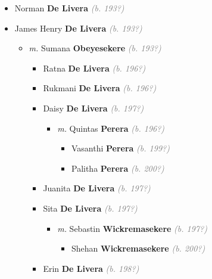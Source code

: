 \documentclass[10pt, openany]{book}
\begin{document}
\begin{itemize}
{\begin{itemize}
\item{Norman \textbf{De Livera} \textcolor{gray}{\textit{(b. 193?)}}
  }
\item{James Henry  \textbf{De Livera} \textcolor{gray}{\textit{(b. 193?)}}
\begin{itemize}
\item{\textit{m.} Sumana \textbf{Obeyesekere} \textcolor{gray}{\textit{(b. 193?)}}   \label{couple:00001229:00002347} \begin{itemize}
\item{Ratna \textbf{De Livera} \textcolor{gray}{\textit{(b. 196?)}}
  }
\item{Rukmani \textbf{De Livera} \textcolor{gray}{\textit{(b. 196?)}}
  }
\item{Daisy \textbf{De Livera} \textcolor{gray}{\textit{(b. 197?)}}
\begin{itemize}
\item{\textit{m.} Quintas \textbf{Perera} \textcolor{gray}{\textit{(b. 196?)}}   \label{couple:00002348:00002354} \begin{itemize}
\item{Vasanthi \textbf{Perera} \textcolor{gray}{\textit{(b. 199?)}}
 }
\item{Palitha \textbf{Perera} \textcolor{gray}{\textit{(b. 200?)}}
 }
\end{itemize}}
\end{itemize}
  }
\item{Juanita \textbf{De Livera} \textcolor{gray}{\textit{(b. 197?)}}
  }
\item{Sita \textbf{De Livera} \textcolor{gray}{\textit{(b. 197?)}}
\begin{itemize}
\item{\textit{m.} Sebastin \textbf{Wickremasekere} \textcolor{gray}{\textit{(b. 197?)}}   \label{couple:00002349:00002359} \begin{itemize}
\item{Shehan \textbf{Wickremasekere} \textcolor{gray}{\textit{(b. 200?)}}
 }
\end{itemize}}
\end{itemize}
  }
\item{Erin \textbf{De Livera} \textcolor{gray}{\textit{(b. 198?)}}
\begin{itemize}

\end{itemize}}
\end{itemize}}
\end{itemize}}
\end{itemize}}
\end{itemize}
\end{document}
